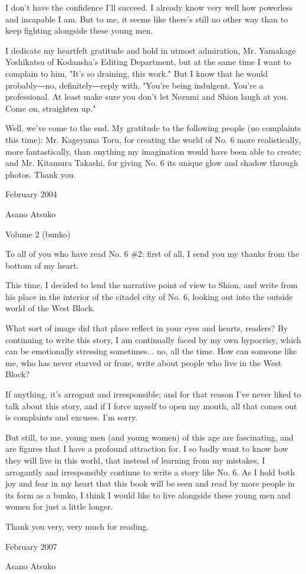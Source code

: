 I don't have the confidence I'll succeed. I already know very well how
powerless and incapable I am. But to me, it seems like there's still no
other way than to keep fighting alongside these young men.

I dedicate my heartfelt gratitude and hold in utmost admiration, Mr.
Yamakage Yoshikatsu of Kodansha's Editing Department, but at the same
time I want to complain to him, "It's so draining, this work." But I
know that he would probably―no, definitely―reply with, "You're being
indulgent. You're a professional. At least make sure you don't let
Nezumi and Shion laugh at you. Come on, straighten up."

Well, we've come to the end. My gratitude to the following people (no
complaints this time): Mr. Kageyama Toru, for creating the world of No.
6 more realistically, more fantastically, than anything my imagination
would have been able to create; and Mr. Kitamura Takashi, for giving No.
6 its unique glow and shadow through photos. Thank you.

February 2004

Asano Atsuko

Volume 2 (bunko)

To all of you who have read No. 6 \#2: first of all, I send you my
thanks from the bottom of my heart.

This time, I decided to lend the narrative point of view to Shion, and
write from his place in the interior of the citadel city of No. 6,
looking out into the outside world of the West Block.

What sort of image did that place reflect in your eyes and hearts,
readers? By continuing to write this story, I am continually faced by my
own hypocrisy, which can be emotionally stressing sometimes... no, all
the time. How can someone like me, who has never starved or froze, write
about people who live in the West Block?

If anything, it's arrogant and irresponsible; and for that reason I've
never liked to talk about this story, and if I force myself to open my
mouth, all that comes out is complaints and excuses. I'm sorry.

But still, to me, young men (and young women) of this age are
fascinating, and are figures that I have a profound attraction for. I so
badly want to know how they will live in this world, that instead of
learning from my mistakes, I arrogantly and irresponsibly continue to
write a story like No. 6. As I hold both joy and fear in my heart that
this book will be seen and read by more people in its form as a bunko, I
think I would like to live alongside these young men and women for just
a little longer.

Thank you very, very much for reading.

February 2007

Asano Atsuko
